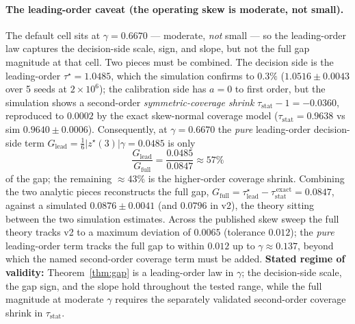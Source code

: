 \paragraph{The leading-order caveat (the operating skew is moderate, not small).}
The default cell sits at $\gamma=0.6670$ --- moderate, \emph{not} small --- so the leading-order law
captures the decision-side scale, sign, and slope, but not the full gap magnitude at that cell. Two
pieces must be combined. The decision side is the leading-order $\tau^\star=1.0485$, which the
simulation confirms to $0.3\%$ ($1.0516\pm0.0043$ over 5 seeds at $2\times10^6$);
the calibration side has $a=0$ to first order, but the simulation shows a second-order
\emph{symmetric-coverage shrink} $\tau_{\mathrm{stat}}-1=-0.0360$, reproduced to $0.0002$ by the exact
skew-normal coverage model ($\tau_{\mathrm{stat}}=0.9638$ vs sim $0.9640\pm0.0006$).
Consequently, at $\gamma=0.6670$ the \emph{pure} leading-order decision-side term
$G_{\mathrm{lead}}=\tfrac16|z^\star(3)|\gamma=0.0485$ is only
\begin{equation}
\frac{G_{\mathrm{lead}}}{G_{\mathrm{full}}}=\frac{0.0485}{0.0847}\approx 57\%
\label{eq:57pct}
\end{equation}
of the gap; the remaining $\approx 43\%$ is the higher-order coverage shrink. Combining the two
analytic pieces reconstructs the full gap, $G_{\mathrm{full}}=\tau^\star_{\mathrm{lead}}-
\tau_{\mathrm{stat}}^{\,\mathrm{exact}}=0.0847$, against a simulated $0.0876\pm0.0041$ (and $0.0796$
in v2),
the theory sitting between the two simulation estimates. Across the published skew sweep the full
theory tracks v2 to a maximum deviation of $0.0065$ (tolerance $0.012$); the \emph{pure}
leading-order term tracks the full gap to within $0.012$ up to $\gamma\approx 0.137$, beyond which the
named second-order coverage term must be added.
\textbf{Stated regime of validity:} Theorem~\ref{thm:gap} is a leading-order law in $\gamma$; the
decision-side scale, the gap sign, and the slope hold throughout the tested range, while the full
magnitude at moderate $\gamma$ requires the separately validated second-order coverage shrink in
$\tau_{\mathrm{stat}}$.

